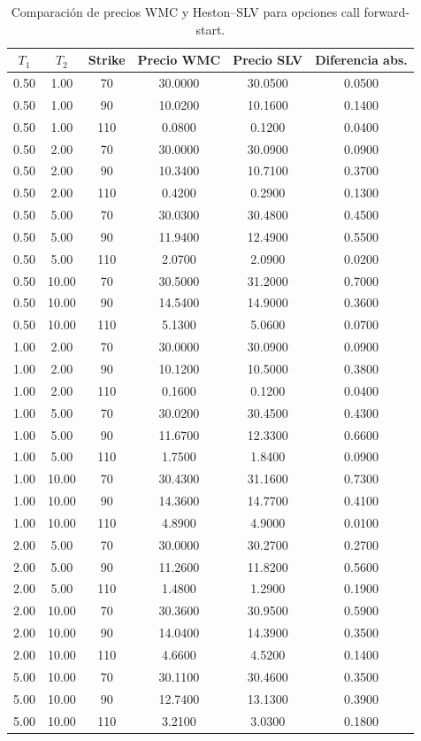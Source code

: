 \begin{table}[H]
\centering
\scriptsize
\begin{tabular}{|c|c|c|c|c|c|}
\hline
\(T_1\) & \(T_2\) & Strike & Precio WMC & Precio SLV & Diferencia abs. \\
\hline
0.50 & 1.00  & 70  & 30.0000 & 30.0500 & 0.0500 \\
0.50 & 1.00  & 90  & 10.0200 & 10.1600 & 0.1400 \\
0.50 & 1.00  & 110 & 0.0800  & 0.1200  & 0.0400 \\
\hline
0.50 & 2.00  & 70  & 30.0000 & 30.0900 & 0.0900 \\
0.50 & 2.00  & 90  & 10.3400 & 10.7100 & 0.3700 \\
0.50 & 2.00  & 110 & 0.4200  & 0.2900  & 0.1300 \\
\hline
0.50 & 5.00  & 70  & 30.0300 & 30.4800 & 0.4500 \\
0.50 & 5.00  & 90  & 11.9400 & 12.4900 & 0.5500 \\
0.50 & 5.00  & 110 & 2.0700  & 2.0900  & 0.0200 \\
\hline
0.50 & 10.00 & 70  & 30.5000 & 31.2000 & 0.7000 \\
0.50 & 10.00 & 90  & 14.5400 & 14.9000 & 0.3600 \\
0.50 & 10.00 & 110 & 5.1300  & 5.0600  & 0.0700 \\
\hline
1.00 & 2.00  & 70  & 30.0000 & 30.0900 & 0.0900 \\
1.00 & 2.00  & 90  & 10.1200 & 10.5000 & 0.3800 \\
1.00 & 2.00  & 110 & 0.1600  & 0.1200  & 0.0400 \\
\hline
1.00 & 5.00  & 70  & 30.0200 & 30.4500 & 0.4300 \\
1.00 & 5.00  & 90  & 11.6700 & 12.3300 & 0.6600 \\
1.00 & 5.00  & 110 & 1.7500  & 1.8400  & 0.0900 \\
\hline
1.00 & 10.00 & 70  & 30.4300 & 31.1600 & 0.7300 \\
1.00 & 10.00 & 90  & 14.3600 & 14.7700 & 0.4100 \\
1.00 & 10.00 & 110 & 4.8900  & 4.9000  & 0.0100 \\
\hline
2.00 & 5.00  & 70  & 30.0000 & 30.2700 & 0.2700 \\
2.00 & 5.00  & 90  & 11.2600 & 11.8200 & 0.5600 \\
2.00 & 5.00  & 110 & 1.4800  & 1.2900  & 0.1900 \\
\hline
2.00 & 10.00 & 70  & 30.3600 & 30.9500 & 0.5900 \\
2.00 & 10.00 & 90  & 14.0400 & 14.3900 & 0.3500 \\
2.00 & 10.00 & 110 & 4.6600  & 4.5200  & 0.1400 \\
\hline
5.00 & 10.00 & 70  & 30.1100 & 30.4600 & 0.3500 \\
5.00 & 10.00 & 90  & 12.7400 & 13.1300 & 0.3900 \\
5.00 & 10.00 & 110 & 3.2100  & 3.0300  & 0.1800 \\
\hline
\end{tabular}
\caption{Comparación de precios WMC y Heston--SLV para opciones call forward-start.}
\label{tab:comparacion_forward_start_call_precios}
\end{table}

